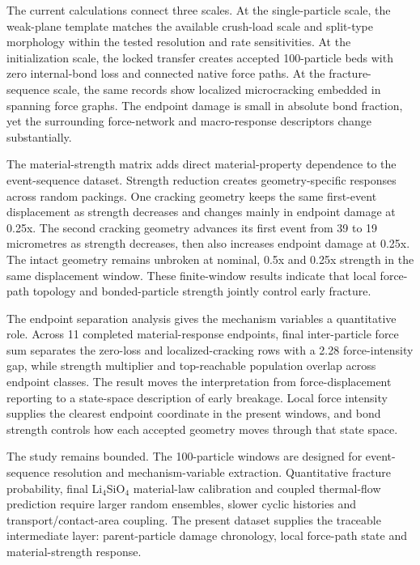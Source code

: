 \documentclass[preprint,12pt]{elsarticle}
\begin{document}
The current calculations connect three scales. At the single-particle scale, the weak-plane template matches the available crush-load scale and split-type morphology within the tested resolution and rate sensitivities. At the initialization scale, the locked transfer creates accepted 100-particle beds with zero internal-bond loss and connected native force paths. At the fracture-sequence scale, the same records show localized microcracking embedded in spanning force graphs. The endpoint damage is small in absolute bond fraction, yet the surrounding force-network and macro-response descriptors change substantially.


The material-strength matrix adds direct material-property dependence to the event-sequence dataset. Strength reduction creates geometry-specific responses across random packings. One cracking geometry keeps the same first-event displacement as strength decreases and changes mainly in endpoint damage at 0.25x. The second cracking geometry advances its first event from 39 to 19 micrometres as strength decreases, then also increases endpoint damage at 0.25x. The intact geometry remains unbroken at nominal, 0.5x and 0.25x strength in the same displacement window. These finite-window results indicate that local force-path topology and bonded-particle strength jointly control early fracture.


The endpoint separation analysis gives the mechanism variables a quantitative role. Across 11 completed material-response endpoints, final inter-particle force sum separates the zero-loss and localized-cracking rows with a 2.28 force-intensity gap, while strength multiplier and top-reachable population overlap across endpoint classes. The result moves the interpretation from force-displacement reporting to a state-space description of early breakage. Local force intensity supplies the clearest endpoint coordinate in the present windows, and bond strength controls how each accepted geometry moves through that state space.


The study remains bounded. The 100-particle windows are designed for event-sequence resolution and mechanism-variable extraction. Quantitative fracture probability, final Li$_4$SiO$_4$ material-law calibration and coupled thermal-flow prediction require larger random ensembles, slower cyclic histories and transport/contact-area coupling. The present dataset supplies the traceable intermediate layer: parent-particle damage chronology, local force-path state and material-strength response.
\end{document}

